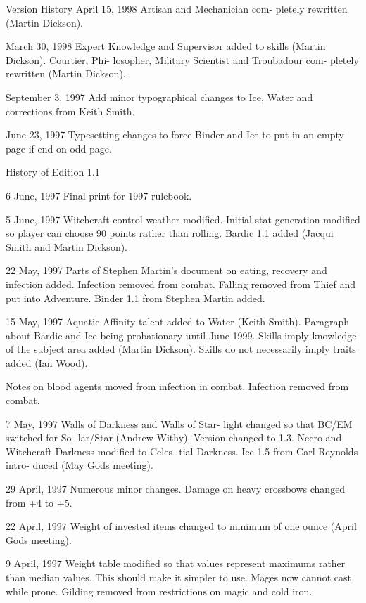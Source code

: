 \begin{Chapter}{Version History}
April  15,  1998  Artisan  and  Mechanician  com-
pletely rewritten (Martin Dickson). 

March 30, 1998 Expert  Knowledge and Supervisor 
added  to  skills  (Martin  Dickson).  Courtier,  Phi-
losopher,  Military  Scientist  and  Troubadour  com-
pletely rewritten (Martin Dickson). 

September  3,  1997  Add  minor  typographical 
changes  to  Ice,  Water  and  corrections  from  Keith 
Smith. 

June 23, 1997 Typesetting changes to force Binder 
and Ice to put in an empty page if end on odd page. 

History of Edition 1.1 

6 June, 1997 Final print for 1997 rulebook. 

5 June, 1997 Witchcraft control weather modified. 
Initial  stat  generation  modified  so  player  can 
choose  90  points  rather  than  rolling.  Bardic  1.1 
added (Jacqui Smith and Martin Dickson). 

22 May, 1997 Parts of Stephen Martin’s document 
on  eating,  recovery  and  infection  added.  Infection 
removed from combat. Falling removed from Thief 
and  put  into  Adventure.  Binder  1.1  from  Stephen 
Martin added. 

15  May,  1997  Aquatic  Affinity  talent  added  to 
Water  (Keith  Smith).  Paragraph  about  Bardic  and 
Ice  being  probationary  until  June  1999.  Skills 
imply knowledge of the subject area added (Martin 
Dickson).  Skills  do  not  necessarily  imply  traits 
added (Ian Wood). 

Notes  on  blood  agents  moved  from  infection  in 
combat. Infection removed from combat. 

7 May, 1997 Walls of Darkness and Walls of Star-
light  changed  so  that  BC/EM  switched  for  So-
lar/Star  (Andrew  Withy).  Version  changed  to  1.3. 
Necro and Witchcraft Darkness modified to Celes-
tial  Darkness.  Ice  1.5  from  Carl  Reynolds  intro-
duced (May Gods meeting). 

29 April, 1997 Numerous minor changes. Damage 
on heavy crossbows changed from +4 to +5. 

22  April, 1997 Weight   of  invested items changed 
to minimum of one ounce (April Gods meeting). 

9 April, 1997 Weight table modified so that values 
represent  maximums  rather  than  median  values. 
This  should  make  it  simpler  to  use.  Mages  now 
cannot  cast  while  prone.  Gilding  removed  from 
restrictions on magic and cold iron. 


\end{Chapter}
